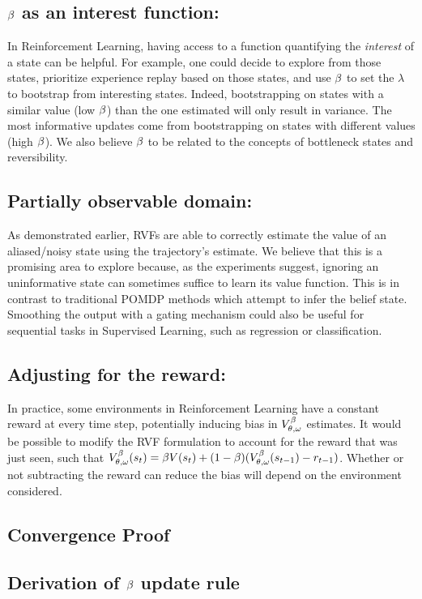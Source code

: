 \subsection{$\beta$ as an interest function:}  In Reinforcement Learning, having access to a function quantifying the \emph{interest} \citep{mahmood2015emphatic} of a state can be helpful. For example, one could decide to explore from those states, prioritize experience replay based on those states, and use $\beta$ to set the $\lambda$ to bootstrap from interesting states. Indeed, bootstrapping on states with a similar value (low $\beta$) than the one estimated will only result in variance. The most informative updates come from bootstrapping on states with different values (high $\beta$). We also believe $\beta$ to be related to the concepts of bottleneck states \citep{tishby2011information} and reversibility.
\subsection{Partially observable domain: } As demonstrated earlier, RVFs are able to correctly estimate the value of an aliased/noisy state using the trajectory's estimate. We believe that this is a promising area to explore because, as the experiments suggest, ignoring an uninformative state can sometimes suffice to learn its value function. This is in contrast to traditional POMDP methods which attempt to infer the belief state. Smoothing the output with a gating mechanism could also be useful for sequential tasks in Supervised Learning, such as regression or classification. 
\subsection{Adjusting for the reward:} In practice, some environments in Reinforcement Learning have
a constant reward at every time step, potentially inducing bias in $V^{\beta}_{\theta, \omega}$ estimates. It would be possible to modify the RVF formulation to account for the reward that was just seen, such that $V^{\beta}_{\theta, \omega}(s_t) = \beta V(s_t) + (1-\beta) (V^{\beta}_{\theta, \omega}(s_{t-1}) - r_{t-1})$.
Whether or not subtracting the reward can reduce the bias will depend on the environment considered.


\subsection{Convergence Proof}


\subsection
{Derivation of $\beta$ update rule}
\label{beta_update_rule}

